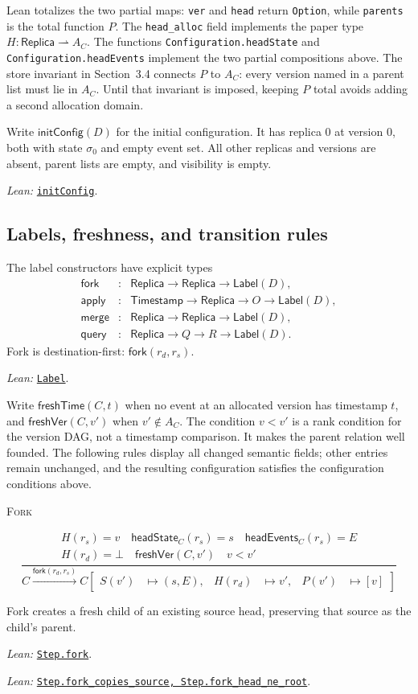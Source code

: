 \documentclass[11pt]{article}
\theoremstyle{definition}
\newcommand{\Replica}{\mathsf{Replica}}
\newcommand{\Time}{\mathsf{Timestamp}}
\newcommand{\init}{\sigma_0}
\newcommand{\none}{\bot}
\newcommand{\lean}[1]{\texttt{#1}}
\newcommand{\src}[2]{\href{../../#1}{\texttt{#2}}}
\newcommand{\anchor}[2]{\par\smallskip\noindent\emph{Lean: }\src{#1}{#2}.}
\newenvironment{semanticrule}[1]
  {\par\medskip\noindent
   \begin{minipage}[t]{0.13\textwidth}\raggedright\scshape #1\end{minipage}%
   \begin{minipage}[t]{0.84\textwidth}\centering\vspace{-1ex}}
  {\end{minipage}\par\medskip}
\begin{document}
Lean totalizes the two partial maps: \lean{ver} and \lean{head} return
\lean{Option}, while \lean{parents} is the total function $P$. The
\lean{head\_alloc} field implements the paper type $H:\Replica\rightharpoonup
A_C$. The functions \lean{Configuration.headState} and
\lean{Configuration.headEvents} implement the two partial compositions above.
The store invariant in Section~3.4 connects $P$ to $A_C$: every version named
in a parent list must lie in $A_C$. Until that invariant is imposed, keeping
$P$ total avoids adding a second allocation domain.

Write $\mathsf{initConfig}(D)$ for the initial configuration. It has replica
$0$ at version $0$, both with state $\init$ and empty event set. All other
replicas and versions are absent, parent lists are empty, and visibility is
empty.
\anchor{Sal/MRDTs/Framework/Execution.lean}{initConfig}

\subsection{Labels, freshness, and transition rules}

The label constructors have explicit types
\[
\begin{array}{rcl}
 \mathsf{fork}&:&\Replica\to\Replica\to\mathsf{Label}(D),\\
 \mathsf{apply}&:&\Time\to\Replica\to O\to\mathsf{Label}(D),\\
 \mathsf{merge}&:&\Replica\to\Replica\to\mathsf{Label}(D),\\
 \mathsf{query}&:&\Replica\to Q\to R\to\mathsf{Label}(D).
\end{array}
\]
Fork is destination-first: $\mathsf{fork}(r_d,r_s)$.
\anchor{Sal/MRDTs/Framework/Execution.lean}{Label}

Write $\mathsf{freshTime}(C,t)$ when no event at an allocated version has
timestamp $t$, and $\mathsf{freshVer}(C,v')$ when $v'\notin A_C$.
The condition $v<v'$ is a rank condition for the version DAG, not a timestamp
comparison. It makes the parent relation well founded. The following rules
display all changed semantic fields; other entries remain unchanged, and the
resulting configuration satisfies the configuration conditions above.

\begin{semanticrule}{Fork}
\[
\frac{
 \begin{gathered}
 H(r_s)=v\quad \mathsf{headState}_C(r_s)=s\quad
 \mathsf{headEvents}_C(r_s)=E\\
 H(r_d)=\none\quad \mathsf{freshVer}(C,v')\quad v<v'
 \end{gathered}
}{
 C\xrightarrow{\mathsf{fork}(r_d,r_s)}
 C\!\left[\begin{aligned}
 S(v')&\mapsto(s,E),&H(r_d)&\mapsto v',&P(v')&\mapsto[v]
 \end{aligned}\right]}
\]
\end{semanticrule}
Fork creates a fresh child of an existing source head, preserving that source
as the child's parent.
\anchor{Sal/MRDTs/Framework/Execution.lean}{Step.fork}
\anchor{Sal/MRDTs/Framework/Execution.lean}
  {Step.fork\_copies\_source, Step.fork\_head\_ne\_root}
\end{document}
